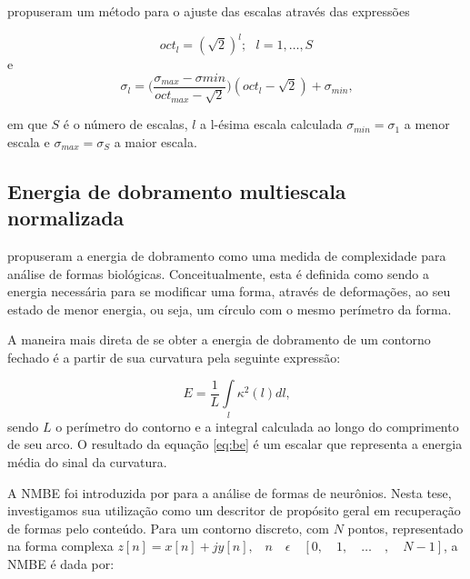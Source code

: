 propuseram um método para o ajuste das escalas através das expressões

\begin{equation}
oct_l = (\sqrt{2})^l;\text{ }l = 1,\ldots,S
\end{equation} 
\noindent e
\begin{equation}
\sigma_l = \big(\frac{\sigma_{max} - \sigma{min}}{oct_{max}-\sqrt{2}}\big)(oct_l - \sqrt{2})+\sigma_{min}\text{,}
\end{equation}

\noindent em que $S$ é o número de escalas, $l$ a l-ésima escala calculada $\sigma_{min} = \sigma_1$ a menor escala e $\sigma_{max} = \sigma_S$ a maior escala.

\subsection*{Energia de dobramento multiescala normalizada\label{subsec:BE}}

 propuseram a energia de dobramento como uma medida de complexidade para análise de formas biológicas. Conceitualmente, esta é definida como sendo a energia necessária para se modificar uma forma, através de deformações, ao seu estado de menor energia, ou seja, um círculo com o mesmo perímetro da forma.

A maneira mais direta de se obter a energia de dobramento de um contorno fechado é a partir de sua curvatura pela seguinte expressão:

\begin{equation}\label{eq:be}
E = \frac{1}{L}\int\limits_{l}\kappa^2(l)dl\text{,}
\end{equation}
\noindent
sendo $L$ o perímetro do contorno e a integral calculada ao longo do comprimento de seu arco. O resultado da equação \ref{eq:be} é um escalar que representa a energia média do sinal da curvatura.

\begin{comment}
A energia de dobramento multiescala é obtida a partir da curvatura multiescala repetindo-se o cálculo da equação \ref{eq:be} para diferentes níveis de suavização do contorno. Isso resulta em um vetor de características composto por escalares decorrentes da curvatura multiescala para cada uma das escalas empregadas na suavização do contorno e cálculo da curvatura. 
\end{comment}

A \acl{NMBE} foi introduzida por  para a análise de formas de neurônios. Nesta tese, investigamos sua utilização como um descritor de propósito geral em recuperação de formas pelo conteúdo. Para um contorno discreto, com $N$ pontos, representado na forma complexa $z[n] = x[n]+jy[n] \text{,} \quad n \quad \epsilon \quad [0, \quad 1, \quad \ldots \quad , \quad N-1]$, a \ac{NMBE} é dada por: 

